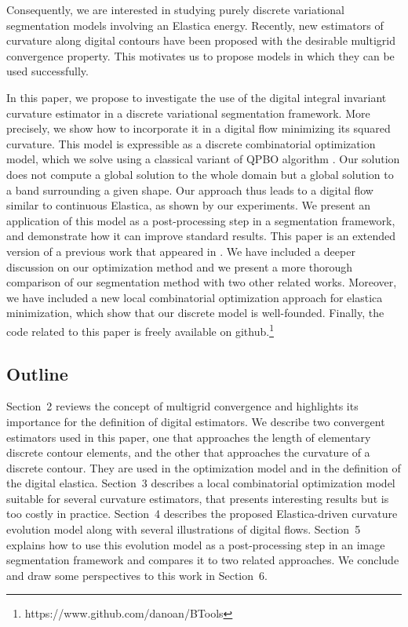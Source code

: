 \documentclass[smallextended]{svjour3}       %
\begin{document}
Consequently, we are interested in studying purely discrete
variational segmentation models involving an Elastica
energy. Recently, new estimators of curvature along digital contours
have been proposed
\cite{roussillon11mdca,coeurjolly13integral,schindele17mdca} with the
desirable multigrid convergence property. This motivates us to propose
models in which they can be used successfully.


In this paper, we propose to investigate the use of the digital
integral invariant curvature estimator \cite{coeurjolly13integral} in
a discrete variational segmentation framework. More precisely, we show
how to incorporate it in a digital flow minimizing its squared
curvature. This model is expressible as a discrete combinatorial
optimization model, which we solve using a classical variant of QPBO
algorithm \cite{rother07qpbo}. Our solution does not compute a global
solution to the whole domain but a global solution to a band
surrounding a given shape. Our approach thus leads to a digital flow
similar to continuous Elastica, as shown by our experiments. We
present an application of this model as a post-processing step in a
segmentation framework, and demonstrate how it can improve standard
results. This paper is an extended version of a previous work that
appeared in \cite{antunes19}. We have included a deeper discussion on
our optimization method and we present a more thorough comparison of
our segmentation method with two other related works. Moreover, we
have included a new local combinatorial optimization approach for
elastica minimization, which show that our discrete model is
well-founded. Finally, the code related to this paper is freely
available on github.\footnote{https://www.github.com/danoan/BTools}


\subsection{Outline}
Section~2 reviews the concept of multigrid convergence and highlights
its importance for the definition of digital estimators. We describe
two convergent estimators used in this paper, one that approaches the
length of elementary discrete contour elements, and the other that
approaches the curvature of a discrete contour. They are used in the
optimization model and in the definition of the digital
elastica. Section~3 describes a local combinatorial optimization model
suitable for several curvature estimators, that presents interesting
results but is too costly in practice. Section~4 describes the
proposed Elastica-driven curvature evolution model along with several
illustrations of digital flows. Section~5 explains how to use this
evolution model as a post-processing step in an image segmentation
framework and compares it to two related approaches. We conclude and
draw some perspectives to this work in Section~6.
\end{document}
